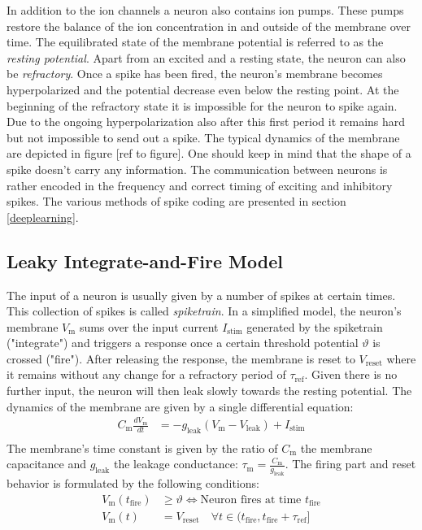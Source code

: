 In addition to the ion channels a neuron also contains ion pumps. These pumps restore the balance of the ion concentration in and outside of the membrane over time. The equilibrated state of the membrane potential is referred to as the \textit{resting potential}. Apart from an excited and a resting state, the neuron can also be \textit{refractory}. Once a spike has been fired, the neuron's membrane becomes hyperpolarized and the potential decrease even below the resting point. At the beginning of the refractory state it is impossible for the neuron to spike again. Due to the ongoing hyperpolarization also after this first period it remains hard but not impossible to send out a spike. The typical dynamics of the membrane are depicted in figure [ref to figure]. One should keep in mind that the shape of a spike doesn't carry any information.  The communication between neurons is rather encoded in the frequency and correct timing of exciting and inhibitory spikes. The various methods of spike coding are presented in section \ref{deeplearning}. 

\subsection{Leaky Integrate-and-Fire Model}

The input of a neuron is usually given by a number of spikes at certain times. This collection of spikes is called \textit{spiketrain}. In a simplified model, the neuron's membrane $V_{\text{m}}$ sums over the input current $I_{\text{stim}}$ generated by the spiketrain ("integrate") and triggers a response once a certain threshold potential $\mathcal{\vartheta}$ is crossed ("fire"). After releasing the response, the membrane is reset to $V_{\text{reset}}$ where it remains without any change for a refractory period of $\tau_{\text{ref}}$. Given there is no further input, the neuron will then leak slowly towards the resting potential. The dynamics of the membrane are given by a single differential equation:
\begin{align}
C_{\text{m}} \frac{dV_{\text{m}}}{dt} &= -g_{\text{leak}} (V_{\text{m}} - V_{\text{leak}}) + I_{\text{stim}} \\
\end{align}
The membrane's time constant is given by the ratio of $C_{\text{m}}$ the membrane capacitance and $g_{\text{leak}}$ the leakage conductance: $\tau_{\text{m}} = \frac{C_{\text{m}}}{g_{\text{leak}}}$. The firing part and reset behavior is formulated by the following conditions:
\begin{align}
V_{\text{m}}(t_{\text{fire}}) &\ge \vartheta \Leftrightarrow \text{Neuron fires at time } t_{\text{fire}} \\
V_{\text{m}}(t) &= V_{\text{reset}} \quad \forall t \in (t_{\text{fire}}, t_{\text{fire}} + \tau_{\text{ref}}] 
\end{align}



